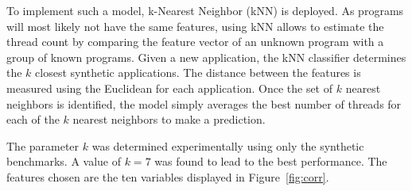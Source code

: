 To implement such a model, k-Nearest Neighbor (kNN) is deployed.
As programs will most likely not have the same features, using kNN allows to estimate the thread count by comparing the feature vector of an unknown program with a group of known programs.
Given a new application, the kNN classifier determines the $k$ closest synthetic applications.
The distance between the features is measured using the Euclidean for each application.
Once the set of $k$ nearest neighbors is identified, the model simply averages the best number of threads for each of the $k$ nearest neighbors to make a prediction. 

The parameter $k$ was determined experimentally using only the synthetic benchmarks.
A value of $k=7$ was found to lead to the best performance.
The features chosen are the ten variables displayed in Figure~\ref{fig:corr}.


